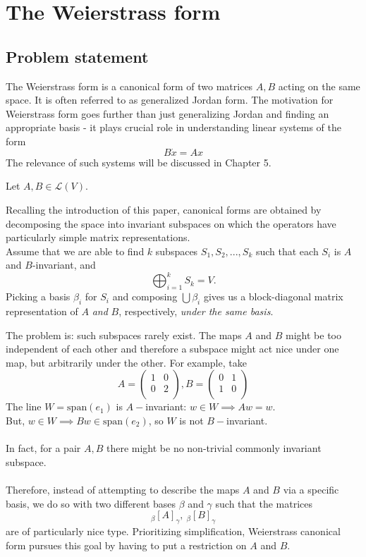 \section{The Weierstrass form}
\subsection{Problem statement}
The Weierstrass form is a canonical form of two matrices $A,B$ acting on the same space.
It is often referred to as generalized Jordan form. The motivation for Weierstrass form goes further than just generalizing Jordan and finding an appropriate basis - it plays crucial role in understanding linear systems of the form $$B\dot{x}=Ax$$
The relevance of such systems will be discussed in Chapter 5.

Let $A,B\in \mathcal{L}(V).$

Recalling the introduction of this paper, canonical forms are obtained by decomposing the space into invariant subspaces on which the operators have particularly simple matrix representations.\\
Assume that we are able to find $k$ subspaces $S_1,S_2,...,S_k$ such that each $S_i$ is $A$ and $B$-invariant, and $$\bigoplus_{i=1}^k S_k=V.$$Picking a basis $\beta_i$ for $S_i$ and composing $\bigcup\beta_i$ gives us a block-diagonal matrix representation of $A$ \textit{and} $B$, respectively, \textit{under the same basis}.

The problem is: such subspaces rarely exist. The maps $A$ and $B$ might be too independent of each other and therefore a subspace might act nice under one map, but arbitrarily under the other. For example, take
\[
	A=
	\begin{pmatrix}
		1  & 0         \\
		0  & 2  \\


	\end{pmatrix}
    ,
    B=
	\begin{pmatrix}
		0  & 1        \\
		1  & 0  \\


	\end{pmatrix}
\]
The line $W=\text{span}(e_1)$ is $A-$invariant: $w\in W \implies Aw=w.$\\
But, $w\in W\implies Bw\in \text{span}(e_2)$, so $W$ is not $B-$invariant.\\ \\
In fact, for a pair $A,B$ there might be no non-trivial commonly invariant subspace.\\ \\
Therefore, instead of attempting to describe the maps $A$ and $B$ via a specific basis, we do so with two different  bases $\beta$ and $\gamma$ such that the matrices
\begin{equation}\label{form}
    _\beta[A]_ \gamma,\ _\beta[B]_ \gamma
\end{equation}
are of particularly nice type.
Prioritizing simplification, Weierstrass canonical form pursues this goal by having to put a restriction on $A$ and $B$.

